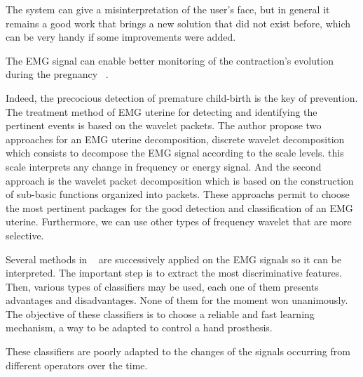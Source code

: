 \documentclass[conference]{IEEEtran}
\begin{document}
The system can give a misinterpretation of the user's face, but in general it remains a good work that brings a new solution that did not exist before, which can be very handy if some improvements were added.\par
The EMG signal can enable better monitoring of the contraction's evolution during the pregnancy~\cite{Chendab} .\par Indeed, the precocious detection of premature child-birth is the key of prevention. The treatment method of EMG uterine for detecting and identifying the pertinent events is based on the wavelet packets.
The author propose two approaches for an EMG uterine decomposition, discrete wavelet decomposition which consists to decompose the EMG signal according to the scale levels. this scale interprets any change in frequency or energy signal. And the second approach is the wavelet packet decomposition which is based on the construction of sub-basic functions organized into packets.
These approachs permit to choose the most pertinent packages for the good detection and classification of an EMG uterine. Furthermore, we can use other types of frequency wavelet that are more selective.\par
Several methods in ~\cite{huet} are successively applied on the EMG signals so it can be interpreted. The important step is to extract the most discriminative features. Then, various types of classifiers may be used, each one of them presents advantages and disadvantages. None of them for the moment won unanimously. The objective of these classifiers is to choose a reliable and fast learning mechanism, a way to be adapted to control a hand prosthesis.\par

These classifiers are poorly adapted to the changes of the signals occurring from different operators over the time.\par
\end{document}

